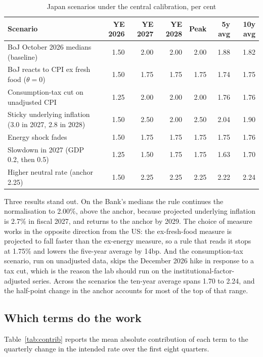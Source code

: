 \documentclass[11pt,a4paper]{article}
\begin{document}
\begin{table}[htbp]
\centering\small
\caption{Japan scenarios under the central calibration, per cent}
\label{tab:jpscen}
\begin{tabular}{@{}L{62mm}rrrrrr@{}}
\toprule
Scenario & YE 2026 & YE 2027 & YE 2028 & Peak & 5y avg & 10y avg \\
\midrule
BoJ October 2026 medians (baseline) & 1.50 & 2.00 & 2.00 & 2.00 & 1.88 & 1.82 \\
BoJ reacts to CPI ex fresh food ($\theta=0$) & 1.50 & 1.75 & 1.75 & 1.75 & 1.74 & 1.75 \\
Consumption-tax cut on unadjusted CPI & 1.25 & 2.00 & 2.00 & 2.00 & 1.76 & 1.76 \\
Sticky underlying inflation (3.0 in 2027, 2.8 in 2028) & 1.50 & 2.50 & 2.00 & 2.50 & 2.04 & 1.90 \\
Energy shock fades & 1.50 & 1.75 & 1.75 & 1.75 & 1.75 & 1.76 \\
Slowdown in 2027 (GDP 0.2, then 0.5) & 1.25 & 1.50 & 1.75 & 1.75 & 1.63 & 1.70 \\
Higher neutral rate (anchor 2.25) & 1.50 & 2.25 & 2.25 & 2.25 & 2.22 & 2.24 \\
\bottomrule
\end{tabular}
\end{table}

Three results stand out. On the Bank's medians the rule continues the normalisation to 2.00\%, above the anchor, because projected underlying inflation is 2.7\% in fiscal 2027, and returns to the anchor by 2029. The choice of measure works in the opposite direction from the US: the ex-fresh-food measure is projected to fall faster than the ex-energy measure, so a rule that reads it stops at 1.75\% and lowers the five-year average by 14bp. And the consumption-tax scenario, run on unadjusted data, skips the December 2026 hike in response to a tax cut, which is the reason the lab should run on the institutional-factor-adjusted series. Across the scenarios the ten-year average spans 1.70 to 2.24, and the half-point change in the anchor accounts for most of the top of that range.

\subsection{Which terms do the work}

Table~\ref{tab:contrib} reports the mean absolute contribution of each term to the quarterly change in the intended rate over the first eight quarters.
\end{document}
